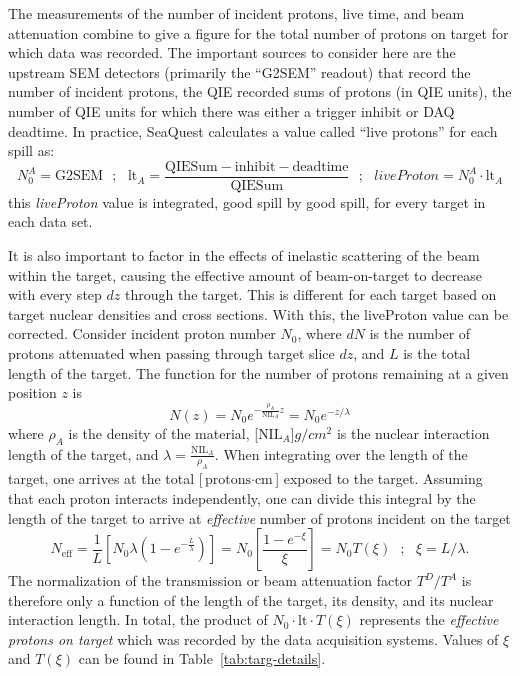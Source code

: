The measurements of the number of incident protons, live time, and beam attenuation combine to give a figure for the total number of protons on target for which data was recorded. The important sources to consider here are the upstream SEM detectors (primarily the ``G2SEM'' readout) that record the number of incident protons, the QIE recorded sums of protons (in QIE units), the number of QIE units for which there was either a trigger inhibit or DAQ deadtime. In practice, SeaQuest calculates a value called ``live protons'' for each spill as:
\begin{equation}
 N_0^A = \text{G2SEM}\ \ \ ;\ \ \ \text{lt}_A = 
 \frac{\text{QIESum} - \text{inhibit} - \text{deadtime}}{\text{QIESum}}\ \ \ ;\ \ \ 
 liveProton = N_0^A \cdot \text{lt}_A
\end{equation}
this \emph{liveProton} value is integrated, good spill by good spill, for every target in each data set.

It is also important to factor in the effects of inelastic scattering of the beam within the target, causing the effective amount of beam-on-target to decrease with every step $dz$ through the target. This is different for each target based on target nuclear densities and cross sections. With this, the liveProton value can be corrected. Consider incident proton number $N_0$, where $dN$ is the number of protons attenuated when passing through target slice $dz$, and $L$ is the total length of the target. The function for the number of protons remaining at a given position $z$ is
\begin{equation}
 N(z) = N_0 e^{-\frac{\rho_A}{\text{NIL}_A} z} = N_0 e^{-z/\lambda}
\end{equation}
where $\rho_A$ is the density of the material, \unit[$\text{NIL}_A$]{$g/cm^2$} is the nuclear interaction length of the target, and $\lambda = \frac{\text{NIL}_A}{\rho_A}$. When integrating over the length of the target, one arrives at the total [$\text{protons}\cdot \text{cm}$] exposed to the target. Assuming that each proton interacts independently, one can divide this integral by the length of the target to arrive at \emph{effective} number of protons incident on the target
\begin{equation}
N_{\text{eff}} = \frac{1}{L} \left[ N_0 \lambda (1 - e^{-\frac{L}{\lambda}})\right] = N_0 \left[\frac{1 - e^{-\xi}}{\xi}\right] =  N_0 T(\xi)\ \ \ ;\ \ \ 
\xi = L/\lambda.
\end{equation}
The normalization of the transmission or beam attenuation factor $T^D/T^A$ is therefore only a function of the length of the target, its density, and its nuclear interaction length. In total, the product of $N_0 \cdot \text{lt} \cdot T(\xi)$ represents the \emph{effective protons on target} which was recorded by the data acquisition systems. Values of $\xi$ and $T(\xi)$ can be found in Table~\ref{tab:targ-details}.

